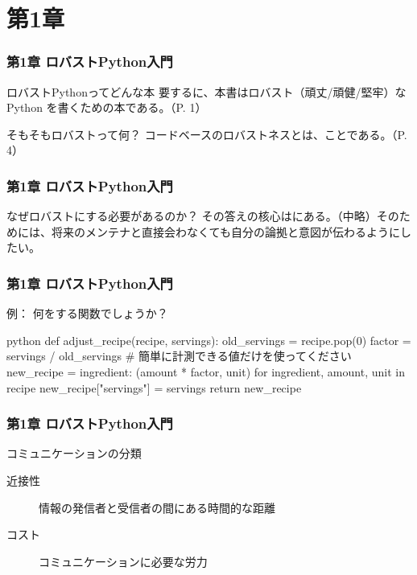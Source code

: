 \documentclass[aspectratio=169,dvipdfmx,12pt,notheorems]{beamer}
\theoremstyle{definition}
\begin{document}
\section{第1章}

\begin{frame}\frametitle{第1章 ロバストPython入門}

\begin{block}{ロバストPythonってどんな本}
要するに、本書はロバスト（頑丈/頑健/堅牢）なPython を書くための本である。（P. 1）
\end{block}

\begin{exampleblock}{そもそもロバストって何？}
コードベースのロバストネスとは、ことである。（P. 4）
\end{exampleblock}

\end{frame}

\begin{frame}\frametitle{第1章 ロバストPython入門}

\begin{block}{なぜロバストにする必要があるのか？}
その答えの核心はにある。（中略）そのためには、将来のメンテナと直接会わなくても自分の論拠と意図が伝わるようにしたい。
\end{block}

\end{frame}

\begin{frame}[fragile]\frametitle{第1章 ロバストPython入門}

\begin{exampleblock}{例： 何をする関数でしょうか？}
\begin{pygments}{python}
def adjust_recipe(recipe, servings):
    old_servings = recipe.pop(0)
    factor = servings / old_servings
    # 簡単に計測できる値だけを使ってください
    new_recipe = {ingredient: (amount * factor, unit) 
                  for ingredient, amount, unit in recipe} 
    new_recipe["servings"] = servings
    return new_recipe
\end{pygments}
\end{exampleblock}

\end{frame}

\begin{frame}\frametitle{第1章 ロバストPython入門}

\begin{block}{コミュニケーションの分類}
\begin{description}
\item[近接性] 情報の発信者と受信者の間にある時間的な距離
\item[コスト] コミュニケーションに必要な労力
\end{description}
\end{block}
\end{frame}
\end{document}
